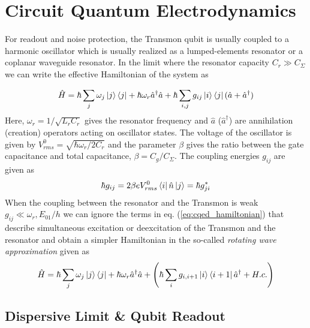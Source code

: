 \section{Circuit Quantum Electrodynamics}

For readout and noise protection, the Transmon qubit is usually coupled to a harmonic oscillator which is usually realized as a lumped-elements resonator or a coplanar waveguide resonator. In the limit where the resonator capacity $C_r \gg C_\Sigma$ we can write the effective Hamiltonian of the system as

\begin{equation}
\hat{H} = \hbar \sum\limits_j \omega_j \left| j \right>\left< j \right| + \hbar \omega_r \hat{a}^\dagger \hat{a} + \hbar \sum\limits_{i,j} g_{ij} \left| i \right>\left< j \right|(\hat{a}+\hat{a}^\dagger) \label{eq:cqed_hamiltonian}
\end{equation}
Here, $\omega_r = 1/\sqrt{L_r C_r}$ gives the resonator frequency and $\hat{a}$ ($\hat{a}^\dagger$) are annihilation (creation) operators acting on oscillator states. The voltage of the oscillator is given by $V_{rms}^0 = \sqrt{\hbar \omega_r / 2 C_r}$ and the parameter $\beta$ gives the ratio between the gate capacitance and total capacitance, $\beta = C_g/C_\Sigma$. The coupling energies $g_{ij}$ are given as
\begin{equation}
\hbar g_{ij} = 2\beta e V_{rms}^0 \left< i \right|\hat{n}\left| j \right> = \hbar g_{ji}^*
\end{equation}
When the coupling between the resonator and the Transmon is weak $g_{ij} \ll \omega_r,E_{01}/h$ we can ignore the terms in eq. (\ref{eq:cqed_hamiltonian}) that describe simultaneous excitation or deexcitation of the Transmon and the resonator and obtain a simpler Hamiltonian in the so-called {\it rotating wave approximation} given as
\begin{equation}
\hat{H} = \hbar \sum\limits_j \omega_j \left| j \right>\left< j \right|+\hbar \omega_r \hat{a}^\dagger \hat{a} + \left( \hbar \sum\limits_i g_{i,i+1} \left| i \right>\left< i+1 \right|\hat{a}^\dagger +H.c.\right)
\end{equation}

\subsection{Dispersive Limit \& Qubit Readout}

